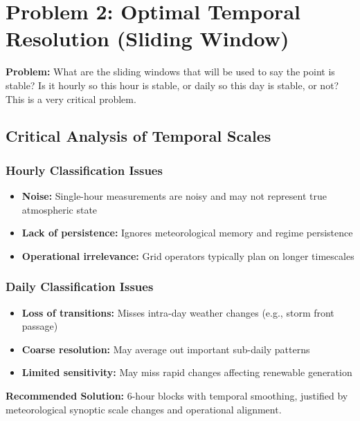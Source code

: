 \documentclass[11pt,a4paper]{article}
\begin{document}
\section{Problem 2: Optimal Temporal Resolution (Sliding Window)}

\begin{problembox}
\textbf{Problem:} What are the sliding windows that will be used to say the point is stable? Is it hourly so this hour is stable, or daily so this day is stable, or not? This is a very critical problem.
\end{problembox}

\subsection{Critical Analysis of Temporal Scales}

\subsubsection{Hourly Classification Issues}
\begin{itemize}
    \item \textbf{Noise:} Single-hour measurements are noisy and may not represent true atmospheric state
    \item \textbf{Lack of persistence:} Ignores meteorological memory and regime persistence
    \item \textbf{Operational irrelevance:} Grid operators typically plan on longer timescales
\end{itemize}

\subsubsection{Daily Classification Issues}
\begin{itemize}
    \item \textbf{Loss of transitions:} Misses intra-day weather changes (e.g., storm front passage)
    \item \textbf{Coarse resolution:} May average out important sub-daily patterns
    \item \textbf{Limited sensitivity:} May miss rapid changes affecting renewable generation
\end{itemize}

\begin{solutionbox}
\textbf{Recommended Solution:} 6-hour blocks with temporal smoothing, justified by meteorological synoptic scale changes and operational alignment.
\end{solutionbox}
\end{document}

